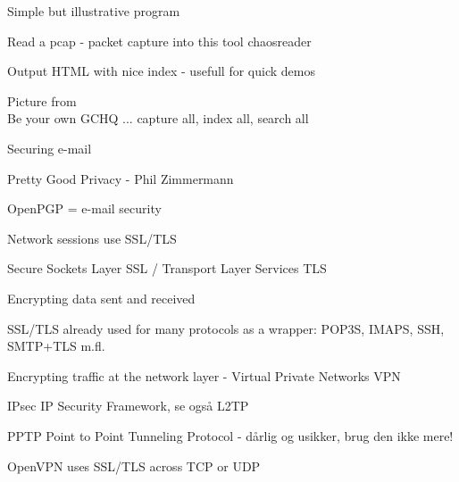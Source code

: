 \documentclass[20pt,landscape,a4paper,footrule]{foils}
\begin{document}

\begin{list1}
\item Simple but illustrative program
\item Read a pcap - packet capture into this tool chaosreader
\item Output HTML with nice index - usefull for quick demos
\item {}

\end{list1}



Picture from \\
Be your own GCHQ ... capture all, index all, search all




\begin{list1}
\item Securing e-mail
\begin{list2}
\item Pretty Good Privacy - Phil Zimmermann
\item OpenPGP = e-mail security
\end{list2}
\item Network sessions use SSL/TLS
\begin{list2}
\item Secure Sockets Layer SSL / Transport Layer Services TLS
\item Encrypting data sent and received
\item SSL/TLS already used for many protocols as a wrapper: POP3S, IMAPS, SSH, SMTP+TLS m.fl.
\end{list2}
\item Encrypting traffic at the network layer - Virtual Private Networks VPN
\begin{list2}
\item {\color{green}IPsec IP Security Framework, se også L2TP}
\item {\color{red} PPTP Point to Point Tunneling Protocol - dårlig og usikker, brug den ikke mere!}
\item OpenVPN uses SSL/TLS across TCP or UDP
\end{list2}
\end{list1}
\end{document}
